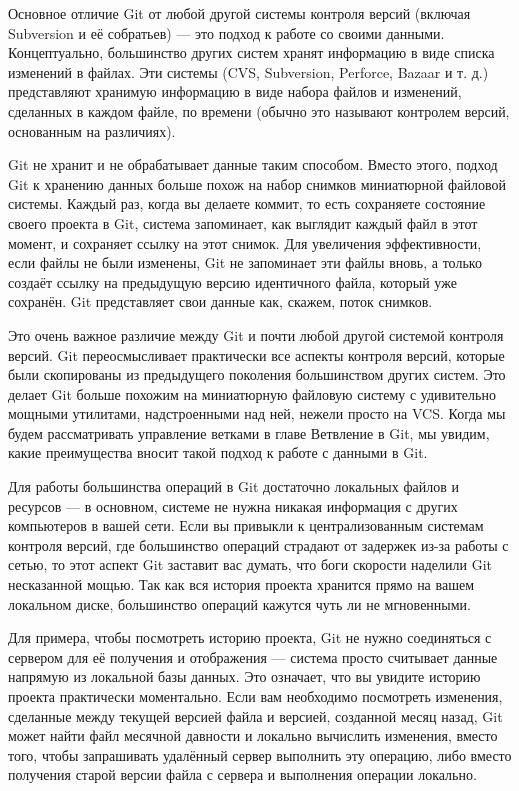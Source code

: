 Основное отличие Git от любой другой системы контроля версий (включая Subversion и её
собратьев) — это подход к работе со своими данными. Концептуально, большинство других
систем хранят информацию в виде списка изменений в файлах. Эти системы (CVS,
Subversion, Perforce, Bazaar и т. д.) представляют хранимую информацию в виде набора
файлов и изменений, сделанных в каждом файле, по времени (обычно это называют
контролем версий, основанным на различиях).

Git не хранит и не обрабатывает данные таким способом. Вместо этого, подход Git к
хранению данных больше похож на набор снимков миниатюрной файловой системы.
Каждый раз, когда вы делаете коммит, то есть сохраняете состояние своего проекта в Git, система запоминает, как выглядит каждый файл в этот момент, и сохраняет ссылку на этот снимок. Для увеличения эффективности, если файлы не были изменены, Git не запоминает эти файлы вновь, а только создаёт ссылку на предыдущую версию идентичного файла, который уже сохранён. Git представляет свои данные как, скажем, поток снимков.

Это очень важное различие между Git и почти любой другой системой контроля версий. Git переосмысливает практически все аспекты контроля версий, которые были скопированы
из предыдущего поколения большинством других систем. Это делает Git больше похожим
на миниатюрную файловую систему с удивительно мощными утилитами, надстроенными
над ней, нежели просто на VCS. Когда мы будем рассматривать управление ветками в главе Ветвление в Git, мы увидим, какие преимущества вносит такой подход к работе с данными в Git.

Для работы большинства операций в Git достаточно локальных файлов и ресурсов —  в основном, системе не нужна никакая информация с других компьютеров в вашей сети.
Если вы привыкли к централизованным системам контроля версий, где большинство
операций страдают от задержек из-за работы с сетью, то этот аспект Git заставит вас думать, что боги скорости наделили Git несказанной мощью. Так как вся история проекта хранится прямо на вашем локальном диске, большинство операций кажутся чуть ли не мгновенными.

Для примера, чтобы посмотреть историю проекта, Git не нужно соединяться с сервером для её получения и отображения — система просто считывает данные напрямую из локальной базы данных. Это означает, что вы увидите историю проекта практически моментально. Если вам необходимо посмотреть изменения, сделанные между текущей версией файла и версией, созданной месяц назад, Git может найти файл месячной давности и локально вычислить изменения, вместо того, чтобы запрашивать удалённый сервер выполнить эту операцию, либо вместо получения старой версии файла с сервера и выполнения операции локально.

